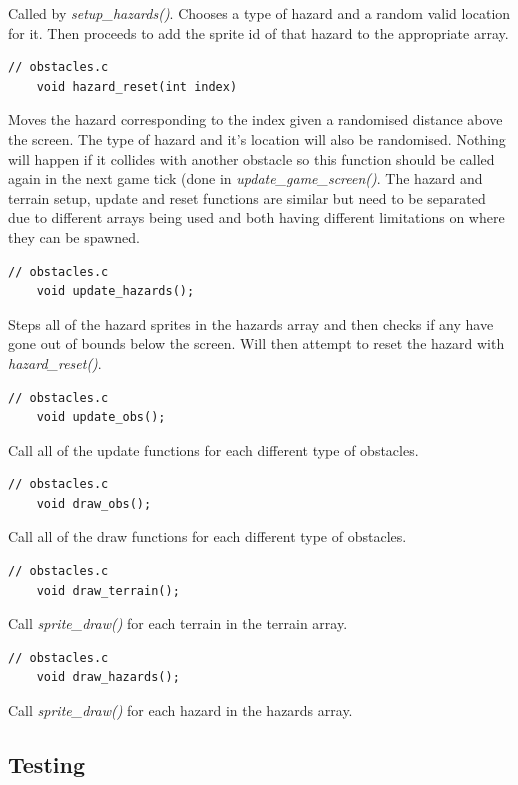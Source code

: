 \documentclass{article}
\begin{document}
Called by \emph{setup\_hazards()}. Chooses a type of hazard and a random valid location for it. Then proceeds to add the sprite id of that hazard to the appropriate array.
\begin{lstlisting}[style=CStyle]
	// obstacles.c
	void hazard_reset(int index)
\end{lstlisting}
Moves the hazard corresponding to the index given a randomised distance above the screen. The type of hazard and it's location will also be randomised. Nothing will happen if it collides with another obstacle so this function should be called again in the next game tick (done in \emph{update\_game\_screen()}. The hazard and terrain setup, update and reset functions are similar but need to be separated due to different arrays being used and both having different limitations on where they can be spawned.
\begin{lstlisting}[style=CStyle]
	// obstacles.c
	void update_hazards();
\end{lstlisting}
Steps all of the hazard sprites in the hazards array and then checks if any have gone out of bounds below the screen. Will then attempt to reset the hazard with \emph{hazard\_reset()}.
\begin{lstlisting}[style=CStyle]
	// obstacles.c
	void update_obs();
\end{lstlisting}
Call all of the update functions for each different type of obstacles.
\begin{lstlisting}[style=CStyle]
	// obstacles.c
	void draw_obs();
\end{lstlisting}
Call all of the draw functions for each different type of obstacles.
\begin{lstlisting}[style=CStyle]
	// obstacles.c
	void draw_terrain();
\end{lstlisting}
Call \emph{sprite\_draw()} for each terrain in the terrain array.
\begin{lstlisting}[style=CStyle]
	// obstacles.c
	void draw_hazards();
\end{lstlisting}
Call \emph{sprite\_draw()} for each hazard in the hazards array.
\newpage

\subsection*{Testing}
\end{document}
